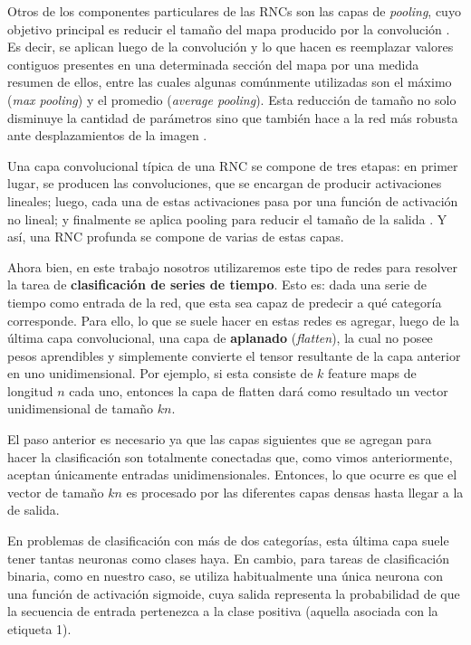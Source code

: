 \documentclass[../../main.tex]{subfiles}
\begin{document}
Otros de los componentes particulares de las RNCs son las capas de \textit{pooling}, cuyo
objetivo principal es reducir el tamaño del mapa producido por la convolución
\cite{hands-on-ML-sklearn-tf}. Es decir, se aplican luego de la convolución y lo que hacen
es reemplazar valores contiguos presentes en una determinada sección del mapa por una medida
resumen de ellos, entre las cuales algunas comúnmente utilizadas son el máximo
(\textit{max pooling}) y el promedio (\textit{average pooling}). Esta reducción de tamaño
no solo disminuye la cantidad de parámetros sino que también hace a la red más robusta
ante desplazamientos de la imagen \cite{hands-on-ML-sklearn-tf}.

Una capa convolucional típica de una RNC se compone de tres etapas: en primer lugar, se
producen las convoluciones, que se encargan de producir activaciones lineales; luego, cada
una de estas activaciones pasa por una función de activación no lineal; y finalmente se
aplica pooling para reducir el tamaño de la salida \cite{deep-learning}. Y así, una RNC
profunda se compone de varias de estas capas.

\bigskip
Ahora bien, en este trabajo nosotros utilizaremos este tipo de redes para resolver la
tarea de \textbf{clasificación de series de tiempo}. Esto es: dada una serie de tiempo
como entrada de la red, que esta sea capaz de predecir a qué categoría corresponde. Para
ello, lo que se suele hacer en estas redes es agregar, luego de la última capa
convolucional, una capa de \textbf{aplanado} (\textit{flatten}), la cual no posee pesos
aprendibles y simplemente convierte el tensor resultante de la capa anterior en uno
unidimensional. Por ejemplo, si esta consiste de \(k\) feature maps de longitud \(n\) cada
uno, entonces la capa de flatten dará como resultado un vector unidimensional de tamaño
\(kn\).

El paso anterior es necesario ya que las capas siguientes que se agregan para hacer la
clasificación son totalmente conectadas que, como vimos anteriormente, aceptan únicamente
entradas unidimensionales. Entonces, lo que ocurre es que el vector de tamaño \(kn\) es
procesado por las diferentes capas densas hasta llegar a la de salida.

En problemas de clasificación con más de dos categorías, esta última capa suele tener
tantas neuronas como clases haya. En cambio, para tareas de clasificación binaria, como en
nuestro caso, se utiliza habitualmente una única neurona con una función de activación
sigmoide, cuya salida representa la probabilidad de que la secuencia de entrada pertenezca
a la clase positiva (aquella asociada con la etiqueta 1).
\end{document}
